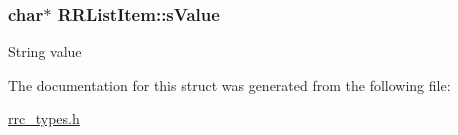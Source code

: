 \subsubsection[{s\+Value}]{\setlength{\rightskip}{0pt plus 5cm}char$\ast$ R\+R\+List\+Item\+::s\+Value}\label{struct_r_r_list_item_acfcabe3d9036821e5631222561c69951}
String value 

The documentation for this struct was generated from the following file\+:\begin{DoxyCompactItemize}
\item 
\hyperlink{rrc__types_8h}{rrc\+\_\+types.\+h}\end{DoxyCompactItemize}
